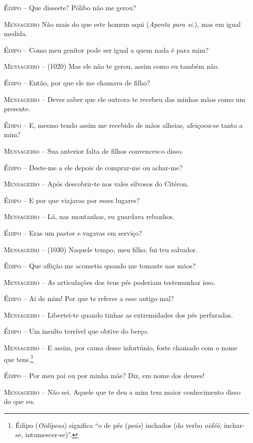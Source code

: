 \textsc{Édipo} --   Que disseste? Pólibo não me gerou?

\textsc{Mensageiro}  Não mais do que este homem aqui (\emph{Aponta para si.}), mas em igual
medida.

\textsc{Édipo} --   Como meu genitor pode ser igual a quem nada é para mim?

\textsc{Mensageiro} --   (1020) Mas ele não te gerou, assim como eu também não.

\textsc{Édipo} --   Então, por que ele me chamava de filho?

\textsc{Mensageiro} --   Deves saber que ele outrora te recebeu das minhas mãos como um presente.

\textsc{Édipo} --   E, mesmo tendo assim me recebido de mãos alheias, afeiçoou-se tanto a
mim?

\textsc{Mensageiro} --   Sua anterior falta de filhos convenceu-o disso.

\textsc{Édipo} --   Deste-me a ele depois de comprar-me ou achar-me?

\textsc{Mensageiro} --   Após descobrir-te nos vales silvosos do Citéron.

\textsc{Édipo} --   E por que viajavas por esses lugares?

\textsc{Mensageiro} --   Lá, nas montanhas, eu guardava rebanhos.

\textsc{Édipo} --   Eras um pastor e vagavas em serviço?

\textsc{Mensageiro} --   (1030) Naquele tempo, meu filho, fui teu salvador.

\textsc{Édipo} --   Que aflição me acometia quando me tomaste nas mãos?

\textsc{Mensageiro} --   As articulações dos teus pés poderiam testemunhar isso.

\textsc{Édipo} --   Ai de mim! Por que te referes a esse antigo mal?

\textsc{Mensageiro} --   Libertei-te quando tinhas as extremidades dos pés perfuradas.

\textsc{Édipo} --   Um insulto terrível que obtive do berço.

\textsc{Mensageiro} --   E assim, por causa desse infortúnio, foste chamado com o nome que
tens.\footnote{Édipo (\emph{Oidípous}) significa ``o de pés (\emph{poús})
  inchados (do verbo \emph{oidéō}, inchar-se, intumescer-se)''.}

\textsc{Édipo} --   Por meu pai ou por minha mãe? Diz, em nome dos deuses!

\textsc{Mensageiro} --   Não sei. Aquele que te deu a mim tem maior conhecimento disso do que eu.

